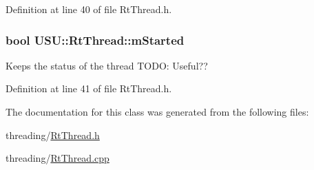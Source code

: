 \-Definition at line 40 of file \-Rt\-Thread.\-h.

\hypertarget{class_u_s_u_1_1_rt_thread_a990cc76b2f9541a6dbafdfa6be5fd367}{
\subsubsection[{m\-Started}]{\setlength{\rightskip}{0pt plus 5cm}bool {\bf \-U\-S\-U\-::\-Rt\-Thread\-::m\-Started}}}\label{class_u_s_u_1_1_rt_thread_a990cc76b2f9541a6dbafdfa6be5fd367}
\-Keeps the status of the thread \-T\-O\-D\-O\-: \-Useful?? 

\-Definition at line 41 of file \-Rt\-Thread.\-h.



\-The documentation for this class was generated from the following files\-:\begin{DoxyCompactItemize}
\item 
threading/\hyperlink{_rt_thread_8h}{\-Rt\-Thread.\-h}\item 
threading/\hyperlink{_rt_thread_8cpp}{\-Rt\-Thread.\-cpp}\end{DoxyCompactItemize}
